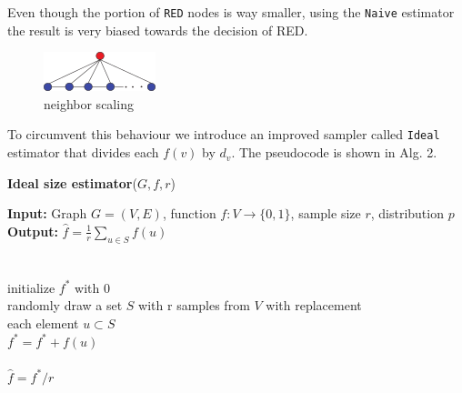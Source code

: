 Even though the portion of \texttt{RED} nodes is way smaller, using the \texttt{Naive} estimator the result is very biased towards the decision of {RED}.
\begin{figure}[!ht]
  \begin{center}
    \includegraphics{fig1a}
    \caption{neighbor scaling}
    \label{fig:}
  \end{center}
\end{figure}

To circumvent this behaviour we introduce an improved sampler called \texttt{Ideal} estimator that divides each $f(v)$ by $d_v$. The pseudocode is shown in Alg. 2.
\begin{algorithm*}[!htb]
\caption{\small {\bf Ideal size estimator}($G, f, r$)}
\begin{code}
{\bf Input:} Graph $G=(V,E)$, function $f : V \rightarrow \{0,1\}$, sample size $r$, distribution $p$ \\
{\bf Output:} $\hat{f}=\frac{1}{r}\sum\nolimits_{u\in S} f(u)$\\
\\
\uln \>\ubegin\\
\uln \>\>initialize $f^*$ with 0 \\
\uln \>\>randomly draw a set $S$ with r samples from $V$ with replacement\\
\uln \>\>\ufor each element $u \subset S$ \udo\\
\uln \>\>\>$f^* = f^* + f(u)$ \\
\uln \>\>\uend\\
\uln \>\ureturn $\hat{f} = f^*/r$ \\
\uln \>\uend\\ 
\end{code}
\label{algideal}
\end{algorithm*}

